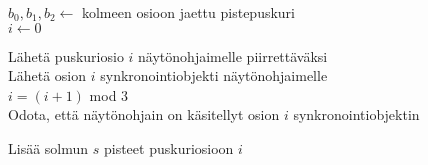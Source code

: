 \perusalgoritmi


$b_0, b_1, b_2 \gets$ kolmeen osioon jaettu pistepuskuri\\
$i \gets 0$ 

 {
     {
        Lähetä puskuriosio $i$ näytönohjaimelle piirrettäväksi\\
        Lähetä osion $i$ synkronointiobjekti näytönohjaimelle\\
        $i = (i + 1)$ mod $3$\\
        Odota, että näytönohjain on käsitellyt osion $i$ synkronointiobjektin
    }
    
    Lisää solmun $s$ pisteet puskuriosioon $i$
    
}
